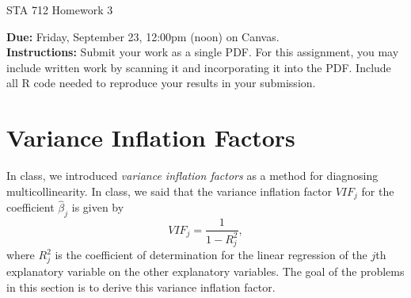 \documentclass[11pt]{article}
\begin{document}
\begin{center}
\Large
STA 712 Homework 3\\
\normalsize
\vspace{5mm}
\end{center}

\noindent \textbf{Due:} Friday, September 23, 12:00pm (noon) on Canvas.\\ 

\noindent \textbf{Instructions:} Submit your work as a single PDF. For this assignment, you may include written work by scanning it and incorporating it into the PDF. Include all R code needed to reproduce your results in your submission.

\section*{Variance Inflation Factors}

In class, we introduced \textit{variance inflation factors} as a method for diagnosing multicollinearity. In class, we said that the variance inflation factor $VIF_j$ for the coefficient $\widehat{\beta}_j$ is given by
$$VIF_j = \dfrac{1}{1 - R^2_j},$$
where $R^2_j$ is the coefficient of determination for the linear regression of the $j$th explanatory variable on the other explanatory variables. The goal of the problems in this section is to derive this variance inflation factor.
\end{document}
